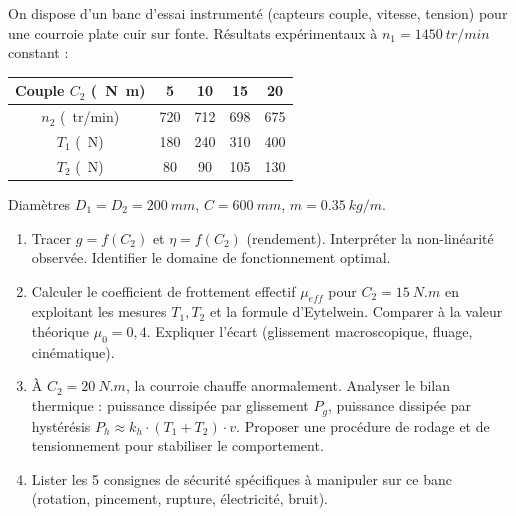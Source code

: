 \documentclass[11pt]{article}
\begin{document}
\begin{exercice}
On dispose d'un banc d'essai instrumenté (capteurs couple, vitesse, tension) pour une courroie plate cuir sur fonte. Résultats expérimentaux à $n_1 = \SI{1450}{tr/min}$ constant :
\begin{center}
\begin{tabular}{|c|c|c|c|c|}
\hline
Couple $C_2$ (\SI{}{N.m}) & 5 & 10 & 15 & 20 \\ \hline
$n_2$ (\SI{}{tr/min}) & 720 & 712 & 698 & 675 \\ \hline
$T_1$ (\SI{}{N}) & 180 & 240 & 310 & 400 \\ \hline
$T_2$ (\SI{}{N}) & 80 & 90 & 105 & 130 \\ \hline
\end{tabular}
\end{center}
Diamètres $D_1 = D_2 = \SI{200}{mm}$, $C = \SI{600}{mm}$, $m = \SI{0,35}{kg/m}$.
\begin{enumerate}
    \item Tracer $g = f(C_2)$ et $\eta = f(C_2)$ (rendement). Interpréter la non-linéarité observée. Identifier le domaine de fonctionnement optimal.
    \item Calculer le coefficient de frottement effectif $\mu_{eff}$ pour $C_2 = \SI{15}{N.m}$ en exploitant les mesures $T_1, T_2$ et la formule d'Eytelwein. Comparer à la valeur théorique $\mu_0 = 0,4$. Expliquer l'écart (glissement macroscopique, fluage, cinématique).
    \item À $C_2 = \SI{20}{N.m}$, la courroie chauffe anormalement. Analyser le bilan thermique : puissance dissipée par glissement $P_g$, puissance dissipée par hystérésis $P_h \approx k_h \cdot (T_1+T_2) \cdot v$. Proposer une procédure de rodage et de tensionnement pour stabiliser le comportement.
    \item Lister les 5 consignes de sécurité spécifiques à manipuler sur ce banc (rotation, pincement, rupture, électricité, bruit).
\end{enumerate}
\end{exercice}
\end{document}
